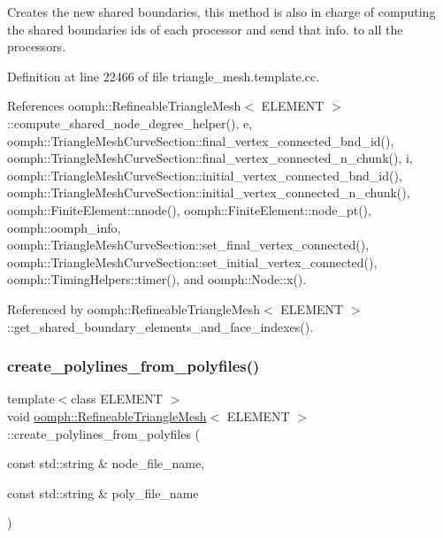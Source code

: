 Creates the new shared boundaries, this method is also in charge of computing the shared boundaries ids of each processor and send that info. to all the processors. 



Definition at line 22466 of file triangle\+\_\+mesh.\+template.\+cc.



References oomph\+::\+Refineable\+Triangle\+Mesh$<$ E\+L\+E\+M\+E\+N\+T $>$\+::compute\+\_\+shared\+\_\+node\+\_\+degree\+\_\+helper(), e, oomph\+::\+Triangle\+Mesh\+Curve\+Section\+::final\+\_\+vertex\+\_\+connected\+\_\+bnd\+\_\+id(), oomph\+::\+Triangle\+Mesh\+Curve\+Section\+::final\+\_\+vertex\+\_\+connected\+\_\+n\+\_\+chunk(), i, oomph\+::\+Triangle\+Mesh\+Curve\+Section\+::initial\+\_\+vertex\+\_\+connected\+\_\+bnd\+\_\+id(), oomph\+::\+Triangle\+Mesh\+Curve\+Section\+::initial\+\_\+vertex\+\_\+connected\+\_\+n\+\_\+chunk(), oomph\+::\+Finite\+Element\+::nnode(), oomph\+::\+Finite\+Element\+::node\+\_\+pt(), oomph\+::oomph\+\_\+info, oomph\+::\+Triangle\+Mesh\+Curve\+Section\+::set\+\_\+final\+\_\+vertex\+\_\+connected(), oomph\+::\+Triangle\+Mesh\+Curve\+Section\+::set\+\_\+initial\+\_\+vertex\+\_\+connected(), oomph\+::\+Timing\+Helpers\+::timer(), and oomph\+::\+Node\+::x().



Referenced by oomph\+::\+Refineable\+Triangle\+Mesh$<$ E\+L\+E\+M\+E\+N\+T $>$\+::get\+\_\+shared\+\_\+boundary\+\_\+elements\+\_\+and\+\_\+face\+\_\+indexes().

\mbox{\label{classoomph_1_1RefineableTriangleMesh_aeae7ba7543ed8e97d32c7c688da48521}} 
\subsubsection{\texorpdfstring{create\+\_\+polylines\+\_\+from\+\_\+polyfiles()}{create\_polylines\_from\_polyfiles()}}
{\footnotesize\ttfamily template$<$class E\+L\+E\+M\+E\+NT $>$ \\
void \hyperlink{classoomph_1_1RefineableTriangleMesh}{oomph\+::\+Refineable\+Triangle\+Mesh}$<$ E\+L\+E\+M\+E\+NT $>$\+::create\+\_\+polylines\+\_\+from\+\_\+polyfiles (\begin{DoxyParamCaption}\item[{const std\+::string \&}]{node\+\_\+file\+\_\+name,  }\item[{const std\+::string \&}]{poly\+\_\+file\+\_\+name }\end{DoxyParamCaption})}



